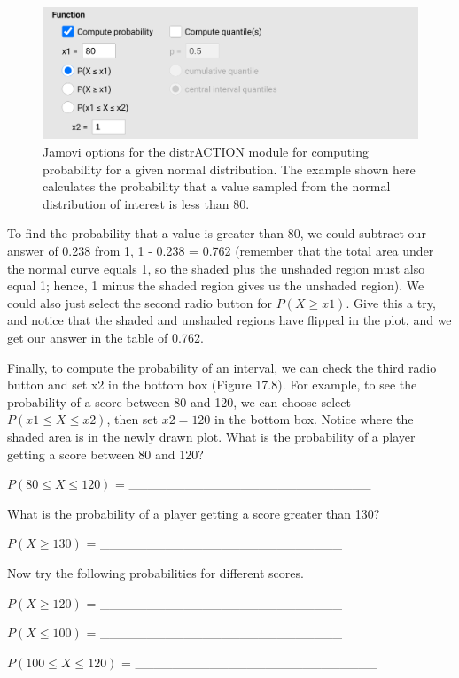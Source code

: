 \documentclass[
]{scrbook}
\begin{document}
\begin{figure}
\includegraphics[width=0.8\linewidth]{img/jamovi_normal_distribution} \caption{Jamovi options for the distrACTION module for computing probability for a given normal distribution. The example shown here calculates the probability that a value sampled from the normal distribution of interest is less than 80.}\label{fig:unnamed-chunk-77}
\end{figure}

To find the probability that a value is greater than 80, we could subtract our answer of 0.238 from 1, 1 - 0.238 = 0.762 (remember that the total area under the normal curve equals 1, so the shaded plus the unshaded region must also equal 1; hence, 1 minus the shaded region gives us the unshaded region).
We could also just select the second radio button for \(P(X \geq x1)\).
Give this a try, and notice that the shaded and unshaded regions have flipped in the plot, and we get our answer in the table of 0.762.

Finally, to compute the probability of an interval, we can check the third radio button and set x2 in the bottom box (Figure 17.8).
For example, to see the probability of a score between 80 and 120, we can choose select \(P(x1 \leq X \leq x2)\), then set \(x2 = 120\) in the bottom box.
Notice where the shaded area is in the newly drawn plot.
What is the probability of a player getting a score between 80 and 120?

\(P(80 \leq X \leq 120)\) = \_\_\_\_\_\_\_\_\_\_\_\_\_\_\_\_\_\_\_\_\_\_\_\_\_\_

What is the probability of a player getting a score greater than 130?

\(P(X \geq 130)\) = \_\_\_\_\_\_\_\_\_\_\_\_\_\_\_\_\_\_\_\_\_\_\_\_\_\_

Now try the following probabilities for different scores.

\(P(X \geq 120)\) = \_\_\_\_\_\_\_\_\_\_\_\_\_\_\_\_\_\_\_\_\_\_\_\_\_\_

\(P(X \leq 100)\) = \_\_\_\_\_\_\_\_\_\_\_\_\_\_\_\_\_\_\_\_\_\_\_\_\_\_

\(P(100 \leq X \leq 120)\) = \_\_\_\_\_\_\_\_\_\_\_\_\_\_\_\_\_\_\_\_\_\_\_\_\_\_
\end{document}
